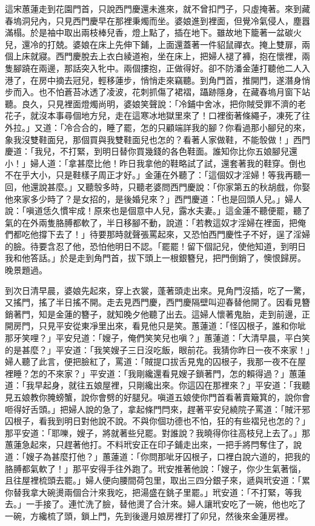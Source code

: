 這宋蕙蓮走到花園門首，只說西門慶還未進來，就不曾扣門子，只虛掩著。來到藏春塢洞兒內，只見西門慶早在那裡秉燭而坐。婆娘進到裡面，但覺冷氣侵人，塵囂滿榻。於是袖中取出兩枝棒兒香，燈上點了，插在地下。雖故地下籠著一盆碳火兒，還冷的打兢。婆娘在床上先伸下鋪，上面還蓋著一件貂鼠禪衣。掩上雙扉，兩個上床就寢。西門慶脫去上衣白綾道袍，坐在床上，把婦人褪了褲，抱在懷裡，兩隻腳蹺在兩邊，那話突入牝中。兩個摟抱，正做得好。卻不防潘金蓮打聽他二人入港了，在房中摘去冠兒，輕移蓮步，悄悄走來竊聽。到角門首，推開門，遂潛身悄步而入。也不怕蒼苔冰透了凌波，花刺抓傷了裙褶，躡跡隱身，在藏春塢月窗下站聽。良久，只見裡面燈燭尚明，婆娘笑聲說：「冷鋪中舍冰，把你賊受罪不濟的老花子，就沒本事尋個地方兒，走在這寒冰地獄里來了！口裡銜著條繩子，凍死了往外拉。」又道：「冷合合的，睡了罷，怎的只顧端詳我的腳？你看過那小腳兒的來，象我沒雙鞋面兒，那個買與我雙鞋面兒也怎的？看著人家做鞋，不能彀做！」西門慶道：「我兒，不打緊，到明日替你買幾錢的各色鞋面。誰知你比你五娘腳兒還小！」婦人道：「拿甚麼比他！昨日我拿他的鞋略試了試，還套著我的鞋穿。倒也不在乎大小，只是鞋樣子周正才好。」金蓮在外聽了：「這個奴才淫婦！等我再聽一回，他還說甚麼。」又聽彀多時，只聽老婆問西門慶說：「你家第五的秋胡戲，你娶他來家多少時了？是女招的，是後婚兒來？」西門慶道：「也是回頭人兒。」婦人說：「嗔道恁久慣牢成！原來也是個意中人兒，露水夫妻。」這金蓮不聽便罷，聽了氣的在外兩隻胳膊都軟了，半日移腳不動，說道：「若教這奴才淫婦在裡面，把俺們都吃他撐下去了！」待要那時就聲張罵起來，又恐怕西門慶性子不好，逞了淫婦的臉。待要含忍了他，恐怕他明日不認。「罷罷！留下個記兒，使他知道，到明日我和他答話。」於是走到角門首，拔下頭上一根銀簪兒，把門倒銷了，懊恨歸房。晚景題過。

到次日清早晨，婆娘先起來，穿上衣裳，蓬著頭走出來。見角門沒插，吃了一驚，又搖門，搖了半日搖不開。走去見西門慶，西門慶隔壁叫迎春替他開了。因看見簪銷著門，知是金蓮的簪子，就知晚夕他聽了出去。這婦人懷著鬼胎，走到前邊，正開房門，只見平安從東凈里出來，看見他只是笑。蕙蓮道：「怪囚根子，誰和你呲那牙笑哩？」平安兒道：「嫂子，俺們笑笑兒也嗔？」蕙蓮道：「大清早晨，平白笑的是甚麼？」平安道：「我笑嫂子三日沒吃飯，眼前花。我猜你昨日一夜不來家！」婦人聽了此言，便把臉紅了，罵道：「賊提口拔舌見鬼的囚根子，我那一夜不在屋裡睡？怎的不來家？」平安道：「我剛纔還看見嫂子鎖著門，怎的賴得過？」蕙蓮道：「我早起身，就往五娘屋裡，只剛纔出來。你這囚在那裡來？」平安道：「我聽見五娘教你腌螃蟹，說你會劈的好腿兒。嗔道五娘使你門首看著賣簸箕的，說你會咂得好舌頭。」把婦人說的急了，拿起條門閂來，趕著平安兒繞院子罵道：「賊汗邪囚根子，看我到明日對他說不說。不與你個功德也不怕，狂的有些褶兒也怎的？」那平安道：「耶嚛，嫂子，將就著些兒罷。對誰說？我曉得你往高枝兒上去了。」那蕙蓮急起來，只趕著他打。不料玳安正在印子鋪走出來，一把手將閂奪住了，說道：「嫂子為甚麼打他？」蕙蓮道：「你問那呲牙囚根子，口裡白說六道的，把我的胳膊都氣軟了！」那平安得手往外跑了。玳安推著他說：「嫂子，你少生氣著惱，且往屋裡梳頭去罷。」婦人便向腰間荷包里，取出三四分銀子來，遞與玳安道：「累你替我拿大碗燙兩個合汁來我吃，把湯盛在銚子里罷。」玳安道：「不打緊，等我去。」一手接了。連忙洗了臉，替他燙了合汁來。婦人讓玳安吃了一碗，他也吃了一碗，方纔梳了頭，鎖上門，先到後邊月娘房裡打了卯兒，然後來金蓮房裡。

